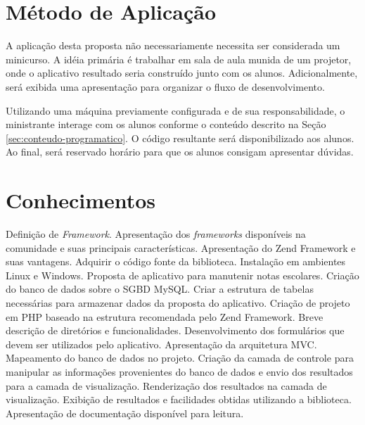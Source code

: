 \documentclass{article}
\begin{document}
\section{Método de Aplicação}
\label{sec:metodo-de-aplicacao}

A aplicação desta proposta não necessariamente necessita ser considerada um
minicurso. A idéia primária é trabalhar em sala de aula munida de um projetor,
onde o aplicativo resultado seria construído junto com os alunos.
Adicionalmente, será exibida uma apresentação para organizar o fluxo de
desenvolvimento.

Utilizando uma máquina previamente configurada e de sua responsabilidade, o
ministrante interage com os alunos conforme o conteúdo descrito na Seção
\ref{sec:conteudo-programatico}. O código resultante será disponibilizado aos
alunos. Ao final, será reservado horário para que os alunos consigam apresentar
dúvidas.

\section{Conhecimentos}
\label{sec:conhecimentos}

Definição de \emph{Framework}. Apresentação dos \emph{frameworks} disponíveis na
comunidade e suas principais características. Apresentação do Zend Framework e
suas vantagens. Adquirir o código fonte da biblioteca. Instalação em ambientes
Linux e Windows. Proposta de aplicativo para manutenir notas escolares. Criação
do banco de dados sobre o SGBD MySQL. Criar a estrutura de tabelas necessárias
para armazenar dados da proposta do aplicativo. Criação de projeto em PHP
baseado na estrutura recomendada pelo Zend Framework. Breve descrição de
diretórios e funcionalidades. Desenvolvimento dos formulários que devem ser
utilizados pelo aplicativo. Apresentação da arquitetura MVC. Mapeamento do banco
de dados no projeto. Criação da camada de controle para manipular as informações
provenientes do banco de dados e envio dos resultados para a camada de
visualização. Renderização dos resultados na camada de visualização.
Exibição de resultados e facilidades obtidas utilizando a biblioteca.
Apresentação de documentação disponível para leitura.



\end{document}
